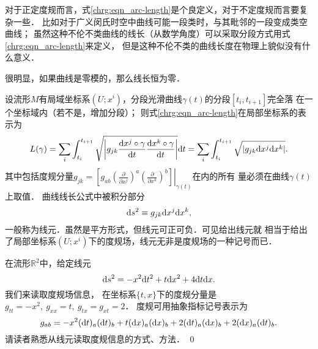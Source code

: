 对于正定度规而言，式\eqref{chrg:eqn_arc-length}是个良定义，对于不定度规而言要复杂一些．
比如对于广义闵氏时空中曲线可能一段类时，与其毗邻的一段变成类空曲线；
虽然这种不伦不类曲线的线长（从数学角度）可以采取分段方式用式\eqref{chrg:eqn_arc-length}来定义，
但是这种不伦不类的曲线长度在物理上貌似没有什么意义．

很明显，如果曲线是零模的，那么线长恒为零．

设流形$M$有局域坐标系$(U;x^i)$，分段光滑曲线$\gamma(t)$的分段$[t_i,t_{i+1}]$完全落
在一个坐标域内（若不是，增加分段）；
则式\eqref{chrg:eqn_arc-length}在局部坐标系的表示为
\setlength{\mathindent}{0em}
\begin{equation}\label{chrg:eqn_arc-length-local}
    L(\gamma)=\sum_{i} \int_{t_i}^{t_{i+1}} \sqrt{\left| g_{jk}
        \frac{{\rm d} x^j\circ\gamma }{{\rm d} t}\frac{{\rm d} x^k\circ\gamma }{{\rm d} t}
        \right|} {\rm d}t
    =\sum_{i} \int_{t_i}^{t_{i+1}} \sqrt{\left| g_{jk} {\rm d} x^j {\rm d} x^k  \right|}  .
\end{equation}\setlength{\mathindent}{2em}
其中包括度规分量$g_{jk}= \left.\left[g_{ab}\left(\frac{\partial}{\partial x^j}\right)^a
\left(\frac{\partial}{\partial x^k}\right)^b \right] \right|_{\gamma(t)}$在内的所有
量必须在曲线$\gamma(t)$上取值．
曲线线长公式中被积分部分
\begin{equation}
    {\rm d}s^2 \equiv g_{jk} {\rm d} x^j {\rm d} x^k ,
\end{equation}
一般称为{\heiti 线元}．虽然是平方形式，但线元可正可负．可见给出线元就
相当于给出了局部坐标系$(U;x^i)$下的度规场，线元无非是度规场的一种记号而已．

\begin{example}
    在流形$\mathbb{R}^2$中，给定线元
    \begin{equation}
        {\rm d}s^2 = -x^2 {\rm d} t^2 + t {\rm d} x^2 + 4 {\rm d} t{\rm d} x.
    \end{equation}
    我们来读取度规场信息，
    在坐标系$\{t,x\}$下的度规分量是$g_{tt}=-x^2,\ g_{xx}=t,\ g_{tx}=g_{xt}=2 $．
    度规可用抽象指标记号表示为
    \begin{equation}
        g_{ab}= -x^2 ({\rm d} t)_a ({\rm d} t)_b +t ({\rm d} x)_a ({\rm d} x)_b
         + 2 ({\rm d} t)_a ({\rm d} x)_b + 2({\rm d} x)_a ({\rm d} t)_b .
    \end{equation}
    请读者熟悉从线元读取度规信息的方式、方法． \qed
\end{example}

